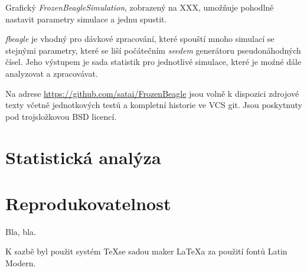 Grafický \textit{FrozenBeagleSimulation}, zobrazený na XXX,
umožňuje pohodlně nastavit parametry simulace a jednu spustit.





\textit{fbeagle} je vhodný pro dávkové zpracování, které spouští mnoho simulací se stejnými parametry, které se liší
počátečním \textit{seedem} generátoru pseudonáhodných čísel. Jeho výstupem je sada statistik pro jednotlivé simulace,
které je moźné dále analyzovat a zpracovávat.

Na adrese \url {https://github.com/satai/FrozenBeagle} jsou volně k dispozici zdrojové texty včetně jednotkových testů
a kompletní historie ve VCS git. Jsou poskytnuty pod trojsložkovou BSD licencí.

\section{Statistická analýza}

\section{Reprodukovatelnost}

Bla, bla.

K sazbě byl použit systém \TeX se sadou maker \LaTeX a za použití fontů Latin Modern.
